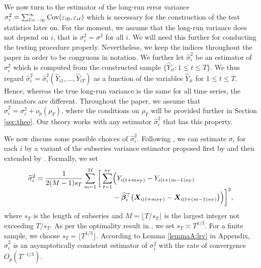 \documentclass[a4paper,12pt]{article}
\begin{document}
We now turn to the estimator of the long-run error variance $\sigma_i^2 = \sum\nolimits_{\ell=-\infty}^{\infty} \textnormal{Cov}(\varepsilon_{i0}, \varepsilon_{i\ell})$ which is necessary for the construction of the test statistics later on. For the moment, we assume that the long-run variance does not depend on $i$, that is $\sigma_i^2 = \sigma^2$ for all $i$. We will need this further for conducting the testing procedure properly. Nevertheless, we keep the indices throughout the paper in order to be congruous in notation. We further let $\widehat{\sigma}_i^2$ be an estimator of $\sigma_i^2$ which is computed from the constructed sample $\{ \widehat{Y}_{it}: 1 \le t \le T \}$. We thus regard $\widehat{\sigma}_i^2 = \widehat{\sigma}_i^2(\widehat{Y}_{i1},\ldots,\widehat{Y}_{iT})$ as a function of the variables $\widehat{Y}_{it}$ for $1 \le t \le T$. Hence, whereas the true long-run variance is the same for all time series, the estimators are different. Throughout the paper, we assume that $\widehat{\sigma}_i^2 = \sigma_i^2 + o_p(\rho_T)$, where the conditions on $\rho_T$ will be provided further in Section \ref{sec:theo}. Our theory works with any estimator $\widehat{\sigma}_i^2$ that has this property. 

We now discuss some possible choices of $\widehat{\sigma}_i^2$. Following \cite{Kim2016}, we can estimate $\sigma_i$ for each $i$ by a variant of the subseries variance estimator proposed first by \cite{Carlstein1986} and then extended by \cite{WuZhao2007}. Formally, we set
\begin{align}
\widehat{\sigma}_i^2 = \frac{1}{2(M-1)s_T}\sum_{m=1}^M \bigg[ \sum_{t = 1}^{s_T} & \Big(Y_{i(t + ms_T)} - Y_{i(t + (m-1)s_T)} \nonumber \\[-0.2cm] & - \widehat{\bm{\beta}}_i^\top\big(\boldsymbol{X}_{i(t+ms_T)} - \boldsymbol{X}_{i(t+(m-1)s_T)}\big) \Big)\bigg]^2, \label{eq:lrv}
\end{align}
where $s_T$ is the length of subseries and $M = \lfloor T/s_T\rfloor$ is the largest integer not exceeding $T/s_T$. As per the optimality result in \cite{Carlstein1986}, we set $s_T \asymp T^{1/3}$. For a finite sample, we choose $s_T = \lfloor T^{1/3}\rfloor$. According to  Lemma \ref{lemmaA:lrv} in Appendix, $\widehat{\sigma}_i^2$ is an asymptotically consistent estimator of $\sigma_i^2$ with the rate of convergence $O_p(T^{-1/3})$.
\end{document}

